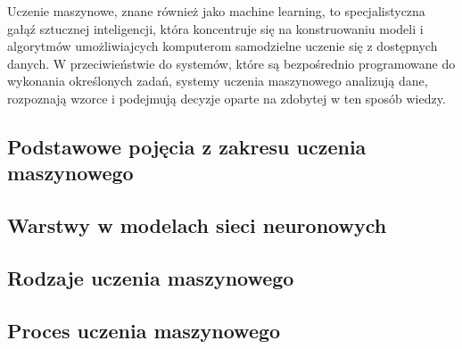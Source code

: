 Uczenie maszynowe, znane również jako machine learning, to specjalistyczna gałąź sztucznej inteligencji,
która koncentruje się na konstruowaniu modeli i algorytmów umożliwiajcych komputerom samodzielne uczenie się z dostępnych danych.
W przeciwieństwie do systemów, które są bezpośrednio programowane do wykonania określonych zadań,
systemy uczenia maszynowego analizują dane, rozpoznają wzorce i podejmują decyzje oparte na zdobytej w ten sposób wiedzy.

\subsection{Podstawowe pojęcia z zakresu uczenia maszynowego}


\subsection{Warstwy w modelach sieci neuronowych}


\subsection{Rodzaje uczenia maszynowego}


\subsection{Proces uczenia maszynowego}
